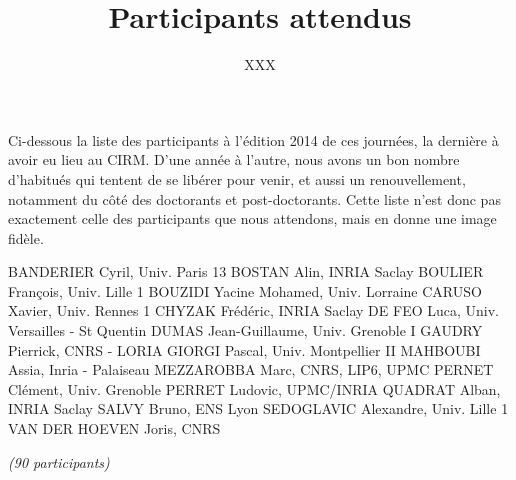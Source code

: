 \documentclass{paper}
\title{Participants attendus}
\subtitle{XXX}
\date{}
\begin{document}
\maketitle
\thispagestyle{empty}

Ci-dessous la liste des participants à l'édition 2014 de ces journées, la dernière à avoir eu lieu au CIRM.
D’une année à l’autre, nous avons un bon nombre d’habitués qui tentent de se libérer pour venir, et aussi un renouvellement, notamment du côté des doctorants et post-doctorants.
Cette liste n’est donc pas exactement celle des participants que nous attendons, mais en donne une image fidèle.

\bigskip

\obeylines
BANDERIER Cyril, Univ. Paris 13
BOSTAN Alin, INRIA Saclay
BOULIER François, Univ. Lille 1
BOUZIDI Yacine Mohamed, Univ. Lorraine
CARUSO Xavier, Univ. Rennes 1
CHYZAK Frédéric, INRIA Saclay
DE FEO Luca, Univ. Versailles - St Quentin
DUMAS Jean-Guillaume, Univ. Grenoble I
GAUDRY Pierrick, CNRS - LORIA
GIORGI Pascal, Univ. Montpellier II
MAHBOUBI Assia, Inria - Palaiseau
MEZZAROBBA Marc, CNRS, LIP6, UPMC
PERNET Clément, Univ. Grenoble
PERRET Ludovic, UPMC/INRIA
QUADRAT Alban, INRIA Saclay
SALVY Bruno, ENS Lyon
SEDOGLAVIC Alexandre, Univ. Lille 1
VAN DER HOEVEN Joris, CNRS

\medskip
\emph{(90 participants)}
\end{document}
